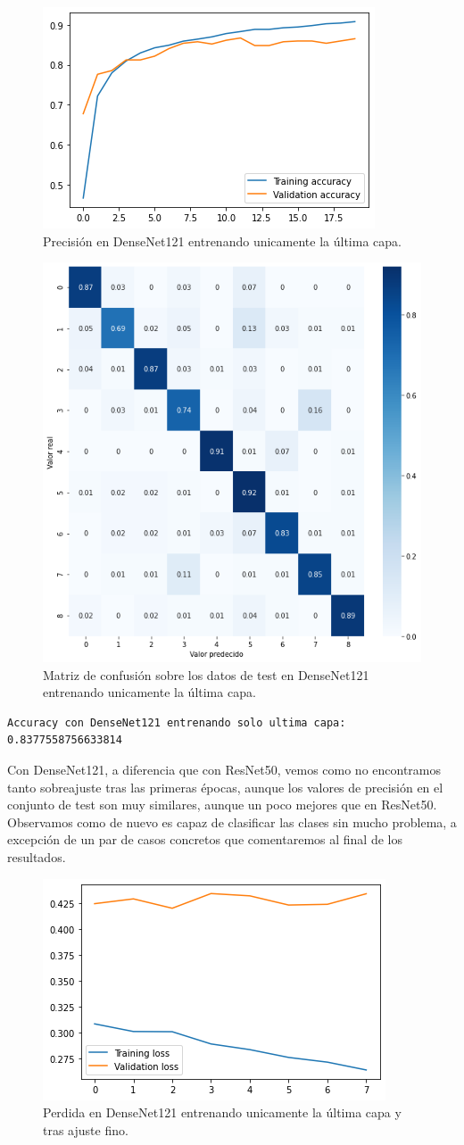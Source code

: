 \begin{figure}[H]
  \centering
  \includegraphics[width=0.5\linewidth]{Imagenes/entrenamiento_redes/ult/densenet_ult_acc.png}
  \caption{Precisión en DenseNet121 entrenando unicamente la última capa.}
\end{figure}

\begin{figure}[H]
  \centering
  \includegraphics[width=0.5\linewidth]{Imagenes/entrenamiento_redes/ult/densenet_ult_matriz.png}
  \caption{Matriz de confusión sobre los datos de test en DenseNet121 entrenando unicamente la última capa.}
\end{figure}

\begin{lstlisting}
Accuracy con DenseNet121 entrenando solo ultima capa: 0.8377558756633814
\end{lstlisting}

Con DenseNet121, a diferencia que con ResNet50, vemos como no encontramos tanto sobreajuste tras las primeras épocas, aunque los valores de precisión en el conjunto de test son muy similares, aunque un poco mejores que en ResNet50. Observamos como de nuevo es capaz de clasificar las clases sin mucho problema, a excepción de un par de casos concretos que comentaremos al final de los resultados.



\begin{figure}[H]
  \centering
  \includegraphics[width=0.5\linewidth]{Imagenes/entrenamiento_redes/ult/densenet_fine_loss.png}
  \caption{Perdida en DenseNet121 entrenando unicamente la última capa y tras ajuste fino.}
\end{figure}

